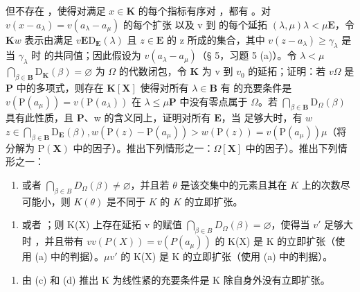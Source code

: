 但不存在 ，使得对满足 \(x \in \mathbf{K}\) 的每个指标有序对 ，都有 。对 \(v(x - a_{\lambda}) = v(a_{\lambda} - a_{\mu})\) 的每个扩张  以及 v 到  的每个延拓 \((\lambda, \mu)\)\(\lambda < \mu\)\(\mathbf{E}\)，令 \(\mathbf{K}\)\(w\) 表示由满足 \(v\)\(\mathbf{E}\)\(\mathrm{D}_{\mathbf{E}}(\lambda)\) 且 \(z \in \mathbf{E}\) 的 z 所成的集合，其中 \(v(z - a_{\lambda}) \geqslant \gamma_{\lambda}\) 是当 \(\gamma_{\lambda}\) 时  的共同值；因此假设为 \(v(a_{\lambda} - a_{\mu})\)（§ 5，习题 5 (a)）。令 \(\lambda < \mu\)\(\bigcap_{\beta \in \mathbf{B}} \mathrm{D}_{\mathbf{K}}(\beta) = \varnothing\) 为 \(\Omega\) 的代数闭包，令 \(\mathbf{K}\) 为 v 到 \(v_0\) 的延拓；证明：若 \(v\)\(\Omega\) 是 \(\mathbf{P}\) 中的多项式，则存在 \(\mathbf{K}[\mathbf{X}]\) 使得对所有 \(\lambda \in \mathbf{B}\) 有  的充要条件是 \(v(\mathrm{P}(a_{\mu})) = v(\mathrm{P}(a_{\lambda}))\) 在 \(\lambda \leqslant \mu\)\(\mathbf{P}\) 中没有零点属于 \(\Omega\)。若 \(\bigcap_{\beta \in \mathbf{B}} \mathrm{D}_{\Omega}(\beta)\) 具有此性质，且 \(\mathbf{P}\)、w 的含义同上，证明对所有 \(\mathbf{E}\)，当  足够大时，有 \(w\)\(z \in \bigcap_{\beta \in \mathbf{B}} \mathrm{D}_{\mathbf{E}}(\beta), w(\mathrm{P}(z) - \mathrm{P}(a_{\mu})) > w(\mathrm{P}(z)) = v(\mathrm{P}(a_{\mu}))\)\(\mu\)（将  分解为 \(\mathrm{P}(\mathbf{X})\) 中的因子）。推出下列情形之一：\(\Omega[\mathbf{X}]\) 中的因子）。推出下列情形之一：

\begin{enumerate}
\def\labelenumi{(\arabic{enumi})}
\tightlist
\item
  或者 \(\bigcap_{\beta \in B} D_{\Omega}(\beta) \neq \varnothing\)，并且若 \(\theta\) 是该交集中的元素且其在 \(K\) 上的次数尽可能小，则 \(K(\theta)\) 是不同于 \(K\) 的 \(K\) 的立即扩张。
\end{enumerate}

\begin{enumerate}
\def\labelenumi{(\arabic{enumi})}
\setcounter{enumi}{1}
\tightlist
\item
  或者 ；则 K(X) 上存在延拓 v 的赋值 \(\bigcap_{\beta \in B} D_{\Omega}(\beta) = \varnothing\)，使得当 \(v'\) 足够大时 ，并且带有 \(v\)\(v(P(X)) = v(P(a_\mu))\) 的 K(X) 是 K 的立即扩张（使用 (a) 中的判据）。\(\mu\)\(v'\) 的 K(X) 是 K 的立即扩张（使用 (a) 中的判据）。
\end{enumerate}

\begin{enumerate}
\def\labelenumi{(\alph{enumi})}
\setcounter{enumi}{4}
\tightlist
\item
  由 (c) 和 (d) 推出 K 为线性紧的充要条件是 K 除自身外没有立即扩张。
\end{enumerate}

